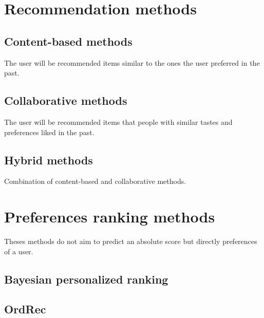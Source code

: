 \documentclass[a4,11pt]{article}
\begin{document}
\section{Recommendation methods}
    \label{sec:Recommendation methods}

\subsection{Content-based methods}
    \label{sub:Content-based methods}
The user will be recommended items similar to the ones the user preferred in
the past.

\subsection{Collaborative methods}
    \label{sub:Collaborative methods}
The user will be recommended items that people with similar tastes and
preferences liked in the past.

\subsection{Hybrid methods}
    \label{sub:Hybrid methods}
Combination of content-based and collaborative methods.

\section{Preferences ranking methods}
    \label{sec:Preferences ranking methods}
Theses methods do not aim to predict an absolute score but directly preferences
of a user.

\subsection{Bayesian personalized ranking}
    \label{sub:Bayesian personalized ranking}

\subsection{OrdRec}
    \label{sub:OrdRec}
\end{document}
